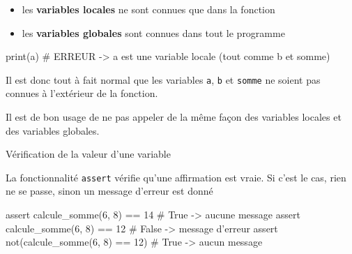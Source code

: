\begin{remarque}
	
	\begin{itemize}
		\item les \textbf{variables locales} ne sont connues que dans la fonction
		\item les \textbf{variables globales} sont connues dans tout le programme
	\end{itemize}

\begin{CodePythontexAlt}[TaillePolice = \large, Centre,PremLigne=1]{}
print(a)   # ERREUR -> a est une variable locale (tout comme b et somme)
\end{CodePythontexAlt}

Il est donc tout à fait normal que les variables \verb+a+, \verb+b+ et \verb+somme+ ne soient pas connues à l'extérieur de la fonction.

Il est de bon usage de ne pas appeler de la même façon des variables locales et des variables globales.


\end{remarque}

\begin{easybox}{Vérification de la valeur d'une variable}{}

La fonctionnalité \verb+assert+ vérifie qu'une affirmation est vraie. Si c'est le cas, rien ne se passe, sinon un message d'erreur est donné
\begin{CodePythontexAlt}[TaillePolice = \large, Centre,PremLigne=1]{}
assert calcule_somme(6, 8) == 14     	# True -> aucune message 
assert calcule_somme(6, 8) == 12     	# False -> message d'erreur 
assert not(calcule_somme(6, 8) == 12)	# True -> aucun message

\end{CodePythontexAlt}
\end{easybox}

